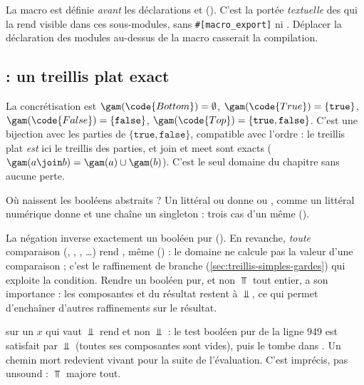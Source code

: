 La macro est définie \emph{avant} les déclarations  et
 (). C'est la
portée \emph{textuelle} des  qui la rend visible dans ces
sous-modules, sans \texttt{\#[macro\_export]} ni . Déplacer la
déclaration des modules au-dessus de la macro casserait la compilation.

\subsection{ : un treillis plat exact}


La concrétisation est
$\gam(\code{Bottom}) = \emptyset$, $\gam(\code{True}) = \{\mathtt{true}\}$,
$\gam(\code{False}) = \{\mathtt{false}\}$,
$\gam(\code{Top}) = \{\mathtt{true}, \mathtt{false}\}$. C'est une bijection
avec les parties de $\{\mathtt{true}, \mathtt{false}\}$, compatible avec
l'ordre : le treillis plat \emph{est} ici le treillis des parties, et join et
meet sont exacts ($\gam(a \join b) = \gam(a) \cup \gam(b)$). C'est le seul
domaine du chapitre sans aucune perte.

Où naissent les booléens abstraits ? Un littéral  ou 
donne  ou , comme un littéral numérique donne
 et une chaîne un singleton : trois cas d'un même
 ().

La négation  inverse exactement un
booléen pur (). En
revanche, \emph{toute} comparaison (\code{==}, \code{<}, ,
\dots) rend , même 
() : le domaine ne
calcule pas la valeur d'une comparaison ; c'est le raffinement de branche
(\cref{sec:treillis-simples-gardes}) qui exploite la condition. Rendre un
booléen pur, et non $\Top$ tout entier, a son importance : les composantes
 et  du résultat restent à $\Bot$, ce qui permet
d'enchaîner d'autres raffinements sur le résultat.

\begin{piege}
   sur un $x$ qui vaut $\Bot$ rend  et non
  $\Bot$ : le test \og booléen pur\fg{} de la ligne 949 est satisfait par
  $\Bot$ (toutes ses composantes sont vides), puis le  tombe dans
  . Un chemin mort redevient vivant pour la suite
  de l'évaluation. C'est imprécis, pas unsound : $\Top$ majore tout.
\end{piege}

